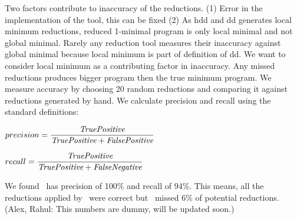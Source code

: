 Two factors contribute to inaccuracy of the reductions. (1) Error in the implementation of the tool, this can be fixed (2) As hdd and dd generates local minimum reductions, reduced 1-minimal program is only local minimal and not global minimal. Rarely any reduction tool measures their inaccuracy  against global minimal because local minimum is part of definition of dd. We want to consider local minimum as a contributing factor in inaccuracy. Any missed reductions produces bigger program then the true minimum program. We measure accuracy by choosing 20 random reductions and comparing it against reductions generated by hand. We calculate precision and recall using the standard definitions:

$precision =  \dfrac{\emph{TruePositive}}{ \emph{TruePositive} + \emph{FalsePositive}}$ 

$recall =  \dfrac{\emph{TruePositive}}{ \emph{TruePositive} + \emph{FalseNegative}}$ 

We found \mytool\ has precision of 100\% and recall of 94\%. This means, all the reductions applied by \mytool\ were correct but \mytool\ missed 6\% of potential reductions. (Alex, Rahul: This numbers are dummy, will be updated soon.)

